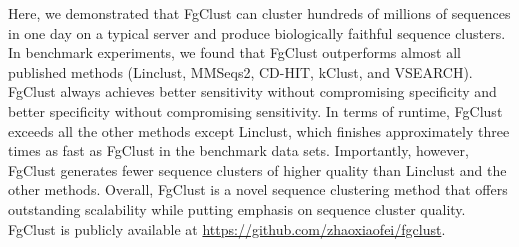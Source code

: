 \documentclass{bioinfo}
\begin{document}
Here, we demonstrated that FgClust can cluster hundreds of millions of sequences in one day on a typical server and produce biologically faithful sequence clusters. In benchmark experiments, we found that FgClust outperforms almost all published methods (Linclust, MMSeqs2, CD-HIT, kClust, and VSEARCH). FgClust always achieves better sensitivity without compromising specificity and better specificity without compromising sensitivity. In terms of runtime, FgClust exceeds all the other methods except Linclust, which finishes approximately three times as fast as FgClust in the benchmark data sets. Importantly, however, FgClust generates fewer sequence clusters of higher quality than Linclust and the other methods. Overall, FgClust is a novel sequence clustering method that offers outstanding scalability while putting emphasis on sequence cluster quality. FgClust is publicly available at \href{https://github.com/zhaoxiaofei/fgclust}{https://github.com/zhaoxiaofei/fgclust}.

\end{document}
